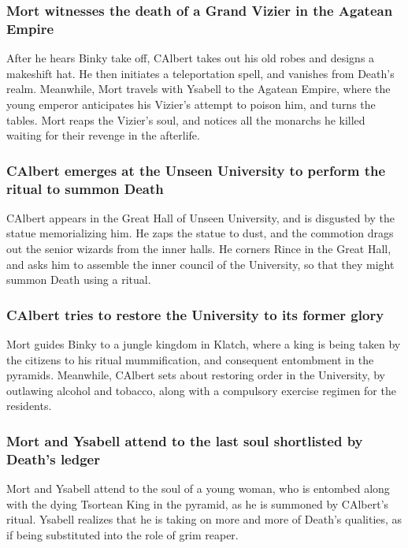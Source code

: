\subsubsection{\Gls{Mort} witnesses the death of a Grand Vizier in the Agatean Empire}
After he hears \Gls{Binky} take off, \Gls{CAlbert} takes out his old robes and designs a makeshift
hat. He then initiates a teleportation spell, and vanishes from \Gls{Death}'s realm. Meanwhile,
\Gls{Mort} travels with \Gls{Ysabell} to the Agatean Empire, where the young emperor anticipates his
Vizier's attempt to poison him, and turns the tables. \Gls{Mort} reaps the Vizier's soul, and
notices all the monarchs he killed waiting for their revenge in the afterlife.

\subsubsection{\Gls{CAlbert} emerges at the Unseen University to perform the ritual to summon
    \Gls{Death}}
\Gls{CAlbert} appears in the Great Hall of Unseen University, and is disgusted by the statue
memorializing him. He zaps the statue to dust, and the commotion drags out the senior wizards from
the inner halls. He corners \Gls{Rince} in the Great Hall, and asks him to assemble the inner
council of the University, so that they might summon \Gls{Death} using a ritual.

\subsubsection{\Gls{CAlbert} tries to restore the University to its former glory}
\Gls{Mort} guides \Gls{Binky} to a jungle kingdom in Klatch, where a king is being taken by the
citizens to his ritual mummification, and consequent entombment in the pyramids. Meanwhile,
\Gls{CAlbert} sets about restoring order in the University, by outlawing alcohol and tobacco, along
with a compulsory exercise regimen for the residents.

\subsubsection{\Gls{Mort} and \Gls{Ysabell} attend to the last soul shortlisted by \Gls{Death}'s
    ledger}
\Gls{Mort} and \Gls{Ysabell} attend to the soul of a young woman, who is entombed along with the
dying Tsortean King in the pyramid, as he is summoned by \Gls{CAlbert}'s ritual. \Gls{Ysabell}
realizes that he is taking on more and more of \Gls{Death}'s qualities, as if being substituted
into the role of grim reaper.

